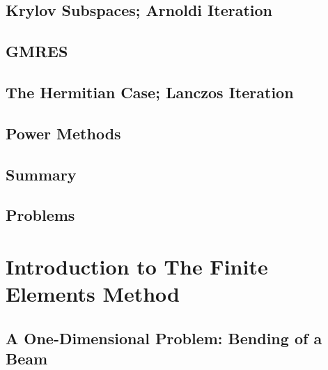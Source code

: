\documentclass[a4paper]{article}
\begin{document}
\subsection{ Krylov Subspaces; Arnoldi Iteration} %

\subsection{ GMRES} %

\subsection{ The Hermitian Case; Lanczos Iteration} %

\subsection{ Power Methods} %

\subsection{ Summary} %

\subsection{ Problems} %


\newpage
\section{Introduction to The Finite Elements Method}
\subsection{ A One-Dimensional Problem: Bending of a Beam} %
\end{document}
